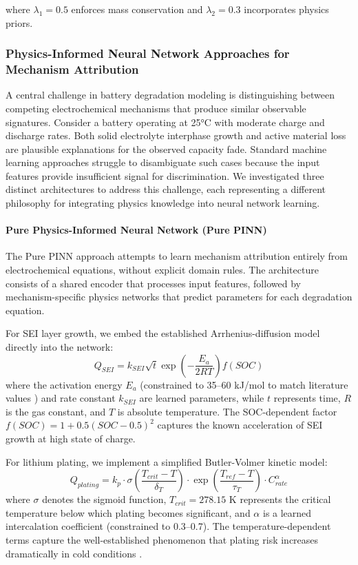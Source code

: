 \documentclass[5p,times,authoryear]{elsarticle}
\begin{document}
where $\lambda_1 = 0.5$ enforces mass conservation and $\lambda_2 = 0.3$ incorporates physics priors.

\subsubsection{Physics-Informed Neural Network Approaches for Mechanism Attribution}

A central challenge in battery degradation modeling is distinguishing between competing electrochemical mechanisms that produce similar observable signatures. Consider a battery operating at 25°C with moderate charge and discharge rates. Both solid electrolyte interphase growth and active material loss are plausible explanations for the observed capacity fade. Standard machine learning approaches struggle to disambiguate such cases because the input features provide insufficient signal for discrimination. We investigated three distinct architectures to address this challenge, each representing a different philosophy for integrating physics knowledge into neural network learning.

\paragraph{Pure Physics-Informed Neural Network (Pure PINN)}

The Pure PINN approach attempts to learn mechanism attribution entirely from electrochemical equations, without explicit domain rules. The architecture consists of a shared encoder that processes input features, followed by mechanism-specific physics networks that predict parameters for each degradation equation.

For SEI layer growth, we embed the established Arrhenius-diffusion model directly into the network:
\begin{equation}
Q_{SEI} = k_{SEI} \sqrt{t} \exp\left(-\frac{E_a}{2RT}\right) f(SOC)
\label{eq:sei_physics}
\end{equation}
where the activation energy $E_a$ (constrained to 35--60 kJ/mol to match literature values \citep{broussely2005main}) and rate constant $k_{SEI}$ are learned parameters, while $t$ represents time, $R$ is the gas constant, and $T$ is absolute temperature. The SOC-dependent factor $f(SOC) = 1 + 0.5(SOC - 0.5)^2$ captures the known acceleration of SEI growth at high state of charge.

For lithium plating, we implement a simplified Butler-Volmer kinetic model:
\begin{equation}
Q_{plating} = k_p \cdot \sigma\left(\frac{T_{crit} - T}{\delta_T}\right) \cdot \exp\left(\frac{T_{ref} - T}{\tau_T}\right) \cdot C_{rate}^\alpha
\label{eq:plating_physics}
\end{equation}
where $\sigma$ denotes the sigmoid function, $T_{crit} = 278.15$ K represents the critical temperature below which plating becomes significant, and $\alpha$ is a learned intercalation coefficient (constrained to 0.3--0.7). The temperature-dependent terms capture the well-established phenomenon that plating risk increases dramatically in cold conditions \citep{waldmann2014temperature}.
\end{document}
